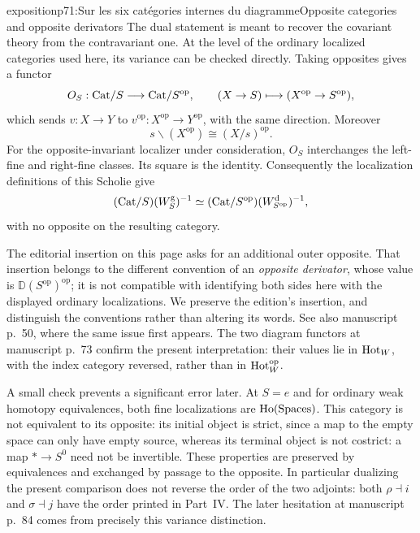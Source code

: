 \begin{dcomment}{exposition}{p71:Sur les six catégories internes du diagramme}{Opposite categories and opposite derivators}
The dual statement is meant to recover the covariant theory from the contravariant one. At the level of the ordinary localized categories used here, its variance can be checked directly. Taking opposites gives a functor
\[
 O_S:\mathrm{Cat}/S\longrightarrow\mathrm{Cat}/S^{\mathrm{op}},
 \qquad (X\to S)\longmapsto(X^{\mathrm{op}}\to S^{\mathrm{op}}),
\]
which sends $v:X\to Y$ to $v^{\mathrm{op}}:X^{\mathrm{op}}\to Y^{\mathrm{op}}$, with the same direction. Moreover
\[
 s\backslash(X^{\mathrm{op}})\cong(X/s)^{\mathrm{op}}.
\]
For the opposite-invariant localizer under consideration, $O_S$ interchanges the left-fine and right-fine classes. Its square is the identity. Consequently the localization definitions of this Scholie give
\[
 (\mathrm{Cat}/S)(W_S^{\mathrm g})^{-1}
       \simeq(\mathrm{Cat}/S^{\mathrm{op}})(W_{S^{\mathrm{op}}}^{\mathrm d})^{-1},
\]
with no opposite on the resulting category.

The editorial insertion on this page asks for an additional outer opposite. That insertion belongs to the different convention of an \emph{opposite derivator}, whose value is $\mathbb D(S^{\mathrm{op}})^{\mathrm{op}}$; it is not compatible with identifying both sides here with the displayed ordinary localizations. We preserve the edition's insertion, and distinguish the conventions rather than altering its words. See also manuscript p.~50, where the same issue first appears. The two diagram functors at manuscript p.~73 confirm the present interpretation: their values lie in $\mathrm{Hot}_W$, with the index category reversed, rather than in $\mathrm{Hot}_W^{\mathrm{op}}$.

A small check prevents a significant error later. At $S=e$ and for ordinary weak homotopy equivalences, both fine localizations are $\mathrm{Ho}(\mathrm{Spaces})$. This category is not equivalent to its opposite: its initial object is strict, since a map to the empty space can only have empty source, whereas its terminal object is not costrict: a map $*\to S^0$ need not be invertible. These properties are preserved by equivalences and exchanged by passage to the opposite. In particular dualizing the present comparison does not reverse the order of the two adjoints: both $\rho\dashv i$ and $\sigma\dashv j$ have the order printed in Part~IV. The later hesitation at manuscript p.~84 comes from precisely this variance distinction.
\end{dcomment}


